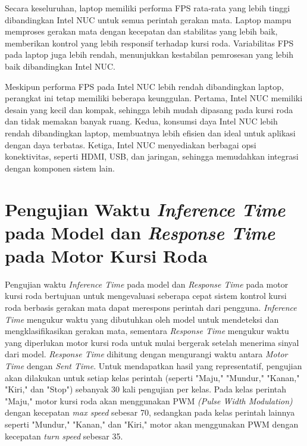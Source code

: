 Secara keseluruhan, laptop memiliki performa FPS rata-rata yang lebih tinggi dibandingkan Intel NUC untuk semua perintah gerakan mata. Laptop mampu memproses gerakan mata dengan kecepatan dan stabilitas yang lebih baik, memberikan kontrol yang lebih responsif terhadap kursi roda. Variabilitas FPS pada laptop juga lebih rendah, menunjukkan kestabilan pemrosesan yang lebih baik dibandingkan Intel NUC.

Meskipun performa FPS pada Intel NUC lebih rendah dibandingkan laptop, perangkat ini tetap memiliki beberapa keunggulan. Pertama, Intel NUC memiliki desain yang kecil dan kompak, sehingga lebih mudah dipasang pada kursi roda dan tidak memakan banyak ruang. Kedua, konsumsi daya Intel NUC lebih rendah dibandingkan laptop, membuatnya lebih efisien dan ideal untuk aplikasi dengan daya terbatas. Ketiga, Intel NUC menyediakan berbagai opsi konektivitas, seperti HDMI, USB, dan jaringan, sehingga memudahkan integrasi dengan komponen sistem lain. 

\section{Pengujian Waktu \emph{Inference Time} pada Model dan \emph{Response Time} pada Motor Kursi Roda}

Pengujian waktu \emph{Inference Time} pada model dan \emph{Response Time} pada motor kursi roda bertujuan untuk mengevaluasi seberapa cepat sistem kontrol kursi roda berbasis gerakan mata dapat merespons perintah dari pengguna. \emph{Inference Time} mengukur waktu yang dibutuhkan oleh model untuk mendeteksi dan mengklasifikasikan gerakan mata, sementara \emph{Response Time} mengukur waktu yang diperlukan motor kursi roda untuk mulai bergerak setelah menerima sinyal dari model. \emph{Response Time} dihitung dengan mengurangi waktu antara \emph{Motor Time} dengan \emph{Sent Time}. Untuk mendapatkan hasil yang representatif, pengujian akan dilakukan untuk setiap kelas perintah (seperti "Maju," "Mundur," "Kanan," "Kiri," dan "Stop") sebanyak 30 kali pengujian per kelas. Pada kelas perintah "Maju," motor kursi roda akan menggunakan PWM \emph{(Pulse Width Modulation)} dengan kecepatan \emph{max speed} sebesar 70, sedangkan pada kelas perintah lainnya seperti "Mundur," "Kanan," dan "Kiri," motor akan menggunakan PWM dengan kecepatan \emph{turn speed} sebesar 35.

